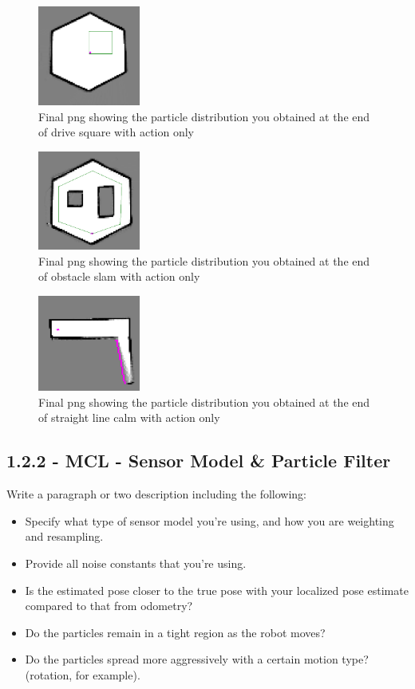 \documentclass[journal,twocolumn]{IEEEtran}
\begin{document}
\begin{figure}[H]
\centering
\includegraphics[width=0.3\textwidth]{Media/1211.png}
\caption{Final png showing the particle distribution you obtained at the end of drive square with action only}
\end{figure}

\begin{figure}[H]
\centering
\includegraphics[width=0.3\textwidth]{Media/1212.png}
\caption{Final png showing the particle distribution you obtained at the end of obstacle slam with action only}
\end{figure}

\begin{figure}[H]
\centering
\includegraphics[width=0.3\textwidth]{Media/1213.png}
\caption{Final png showing the particle distribution you obtained at the end of straight line calm with action only}
\end{figure}

\subsection*{1.2.2 - MCL - Sensor Model \& Particle Filter} 

 Write a paragraph or two description including the following:
 \begin{itemize}
    \item Specify what type of sensor model you're using, and how you are weighting and resampling.
    \item Provide all noise constants that you're using.
    \item Is the estimated pose closer to the true pose with your localized pose estimate compared to that from odometry?
    \item Do the particles remain in a tight region as the robot moves?
    \item Do the particles spread more aggressively with a certain motion type? (rotation, for example).
\end{itemize}
\end{document}
